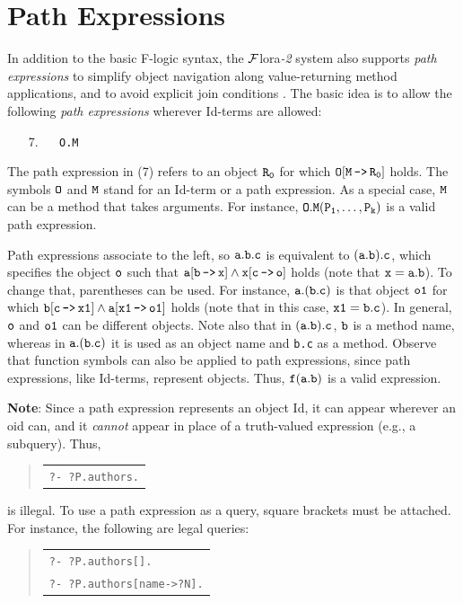 \documentclass[11pt]{article}
\newenvironment{qrules}{\begin{quote}\tt\begin{tabular}[t]{l}}%
{\end{tabular}\end{quote}}
\newcommand{\mvd}{{\mbox{\tt \,->\,}}}  %
\newcommand{\FLORA}{{\mbox{\sc ${\cal F}${lora}\rm\emph{-2}}}\xspace}
\newcommand{\fl}{\mbox{F-logic}\xspace}
\begin{document}
\section{Path Expressions}\label{sec-pathexpr}


 
In addition to the basic \fl syntax, the \FLORA  system also supports
\emph{path expressions} to simplify object navigation along
value-returning method applications, and to avoid
explicit join conditions \cite{frohn-lausen-uphoff-VLDB-94}.  The
basic idea is to allow the following \emph{path expressions} wherever
Id-terms are allowed:

  \medskip

\begin{enumerate} 
\item[7.]\label{eq-path-fun} ~~ {\tt O.M}
\end{enumerate} \medskip

\noindent
The path expression in (7) refers to an object $\tt R_0$ for which $\tt
O[M\mvd R_0]$ holds.  The symbols $\tt O$ and $\tt M$ stand for an Id-term
or a path expression.  As a special case, $\tt M$ can be a method that
takes arguments. For instance, $\tt O.M(P_1,\dots,P_k)$ is a valid path
expression.
  
Path expressions
associate to the left, so $\tt a.b.c$ is equivalent to $\tt (a.b).c$, which
specifies the object $\tt o$ such that $\tt a[b\mvd x] \land x[c\mvd o]$
holds (note that $\tt x=a.b$).
To change that, parentheses can be used. For instance, 
$\tt a.(b.c)$ is that object
$\tt o1$ for which $\tt b[c\mvd x1] \land a[x1\mvd o1]$ holds (note that in this
case, $\tt x1=b.c$). In general, $\tt o$ and $\tt o1$ can be different objects.
Note also that in $\tt (a.b).c$, $\tt b$ is a method name, whereas in $\tt
a.(b.c)$ it is used as an object name and {\tt b.c} as a method.  Observe
that function symbols can also be applied to path expressions, since path
expressions, like Id-terms, represent objects. Thus, $\tt f(a.b)$
is a valid expression.

{\bf Note}: Since a path expression represents an object Id,
it can appear wherever an oid can, and it \emph{cannot} appear in
place of a truth-valued expression (e.g., a subquery).
Thus,
\begin{qrules}
\tt ?- ?P.authors.
\end{qrules}
is illegal. To use a path expression as a
query, square brackets must be attached. For instance, the following are
legal queries:
\begin{qrules}
   \tt ?- ?P.authors[]. \\
   \tt ?- ?P.authors[name->?N].
\end{qrules}
\end{document}
